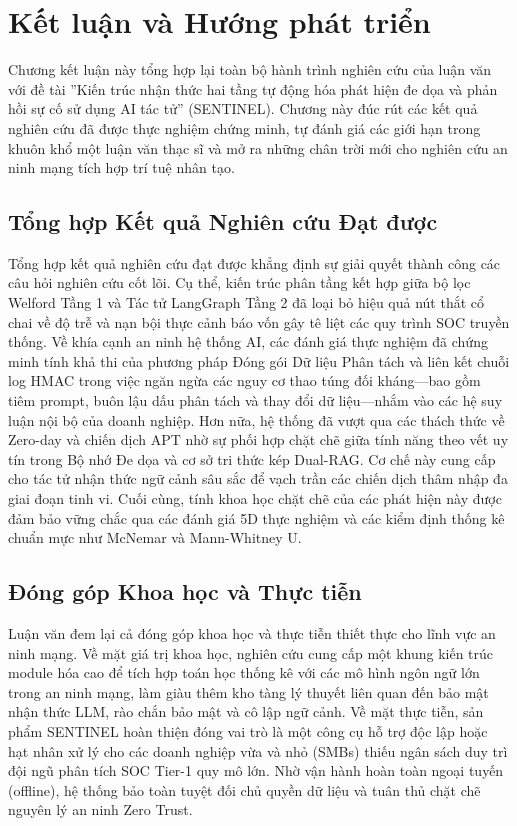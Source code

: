 \chapter{Kết luận và Hướng phát triển}
\label{ch:conclusion}

Chương kết luận này tổng hợp lại toàn bộ hành trình nghiên cứu của luận văn với đề tài ''Kiến trúc nhận thức hai tầng tự động hóa phát hiện đe dọa và phản hồi sự cố sử dụng AI tác tử'' (SENTINEL). Chương này đúc rút các kết quả nghiên cứu đã được thực nghiệm chứng minh, tự đánh giá các giới hạn trong khuôn khổ một luận văn thạc sĩ và mở ra những chân trời mới cho nghiên cứu an ninh mạng tích hợp trí tuệ nhân tạo.

\section{Tổng hợp Kết quả Nghiên cứu Đạt được}
Tổng hợp kết quả nghiên cứu đạt được khẳng định sự giải quyết thành công các câu hỏi nghiên cứu cốt lõi. Cụ thể, kiến trúc phân tầng kết hợp giữa bộ lọc Welford Tầng 1 và Tác tử LangGraph Tầng 2 đã loại bỏ hiệu quả nút thắt cổ chai về độ trễ và nạn bội thực cảnh báo vốn gây tê liệt các quy trình SOC truyền thống. Về khía cạnh an ninh hệ thống AI, các đánh giá thực nghiệm đã chứng minh tính khả thi của phương pháp Đóng gói Dữ liệu Phân tách và liên kết chuỗi log HMAC trong việc ngăn ngừa các nguy cơ thao túng đối kháng—bao gồm tiêm prompt, buôn lậu dấu phân tách và thay đổi dữ liệu—nhắm vào các hệ suy luận nội bộ của doanh nghiệp. Hơn nữa, hệ thống đã vượt qua các thách thức về Zero-day và chiến dịch APT nhờ sự phối hợp chặt chẽ giữa tính năng theo vết uy tín trong Bộ nhớ Đe dọa và cơ sở tri thức kép Dual-RAG. Cơ chế này cung cấp cho tác tử nhận thức ngữ cảnh sâu sắc để vạch trần các chiến dịch thâm nhập đa giai đoạn tinh vi. Cuối cùng, tính khoa học chặt chẽ của các phát hiện này được đảm bảo vững chắc qua các đánh giá 5D thực nghiệm và các kiểm định thống kê chuẩn mực như McNemar và Mann-Whitney U.

\section{Đóng góp Khoa học và Thực tiễn}
Luận văn đem lại cả đóng góp khoa học và thực tiễn thiết thực cho lĩnh vực an ninh mạng. Về mặt giá trị khoa học, nghiên cứu cung cấp một khung kiến trúc module hóa cao để tích hợp toán học thống kê với các mô hình ngôn ngữ lớn trong an ninh mạng, làm giàu thêm kho tàng lý thuyết liên quan đến bảo mật nhận thức LLM, rào chắn bảo mật và cô lập ngữ cảnh. Về mặt thực tiễn, sản phẩm SENTINEL hoàn thiện đóng vai trò là một công cụ hỗ trợ độc lập hoặc hạt nhân xử lý cho các doanh nghiệp vừa và nhỏ (SMBs) thiếu ngân sách duy trì đội ngũ phân tích SOC Tier-1 quy mô lớn. Nhờ vận hành hoàn toàn ngoại tuyến (offline), hệ thống bảo toàn tuyệt đối chủ quyền dữ liệu và tuân thủ chặt chẽ nguyên lý an ninh Zero Trust.

